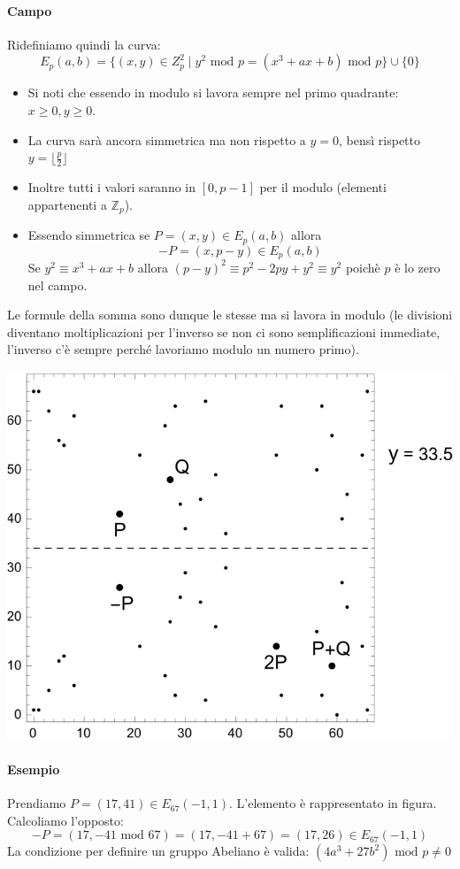 \paragraph{Campo} Ridefiniamo quindi la curva:
$$ E_p(a,b) = \{ (x,y) \in Z_p^2 \mid y^2 \text{ mod } p = (x^3 + ax + b) \text{ mod } p \} \cup \{0\} $$
\begin{itemize}
	\item Si noti che essendo in modulo si lavora sempre nel primo quadrante: $x \geq 0, y \geq 0$.
	\item La curva sarà ancora simmetrica ma non rispetto a  $y = 0$, bensì rispetto $y = \lfloor \frac{p}{2} 	\rfloor$
	\item Inoltre tutti i valori saranno in $[0, p-1]$ per il modulo (elementi appartenenti a $\mathbb{Z}_p$).
	\pagebreak 
	\item Essendo simmetrica se $P=(x,y) \in E_p(a,b)$ allora
	$$-P = (x, p-y) \in E_p(a, b)$$
	Se $y^2 \equiv x^3 + ax + b$ allora $(p-y)^2 \equiv p^2 -2py + y^2 \equiv y^2$ poichè $p$ è lo zero nel campo.
\end{itemize}
Le formule della somma sono dunque le stesse ma si lavora in modulo (le divisioni diventano moltiplicazioni per l'inverso se non ci sono semplificazioni immediate, l'inverso c'è sempre perché lavoriamo modulo un numero primo). 
\begin{center}
	\includegraphics[scale=.5]{images/32.PNG}
\end{center}
\paragraph{Esempio} Prendiamo $P=(17,41) \in E_{67}(-1,1)$. L'elemento è rappresentato in figura. Calcoliamo l'opposto:
$$-P=(17,-41 \text{ mod }67)=(17, -41+67)=(17,26) \in E_{67}(-1,1)$$
La condizione per definire un gruppo Abeliano è valida: $(4a^3+27b^2) \text{ mod } p \neq 0$
